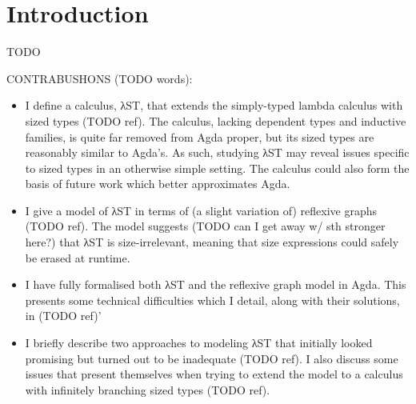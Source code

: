 \chapter{Introduction}

TODO

CONTRABUSHONS (TODO words):

\begin{itemize}
\item I define a calculus, λST, that extends the simply-typed lambda calculus
  with sized types (TODO ref). The calculus, lacking dependent types and
  inductive families, is quite far removed from Agda proper, but its sized types
  are reasonably similar to Agda's. As such, studying λST may reveal issues
  specific to sized types in an otherwise simple setting. The calculus could
  also form the basis of future work which better approximates Agda.
\item I give a model of λST in terms of (a slight variation of) reflexive graphs
  (TODO ref). The model suggests (TODO can I get away w/ sth stronger here?)
  that λST is size-irrelevant, meaning that size expressions could safely be
  erased at runtime.
\item I have fully formalised both λST and the reflexive graph model in Agda.
  This presents some technical difficulties which I detail, along with their
  solutions, in (TODO ref)'
\item I briefly describe two approaches to modeling λST that initially looked
  promising but turned out to be inadequate (TODO ref). I also discuss some
  issues that present themselves when trying to extend the model to a calculus
  with infinitely branching sized types (TODO ref).
\end{itemize}
